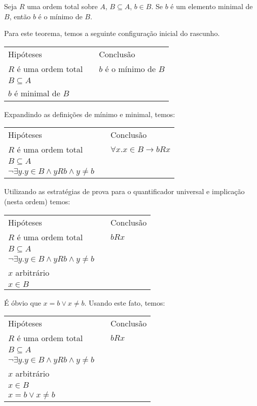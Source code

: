 \begin{Theorem}
Seja $R$ uma ordem total sobre $A$, $B\subseteq A$, $b\in B$. Se $b$ é
um elemento minimal de $B$, então $b$ é o mínimo de $B$.
\end{Theorem}
Para este teorema, temos a seguinte configuração inicial do rascunho.
\begin{flushleft}
\begin{tabular}{lcl}
 Hip\'oteses & \hspace{1cm} & Conclusão\\
$R$ é uma ordem total & & $b$ é o mínimo de $B$\\
$B \subseteq A$ & & \\
$b$ é minimal de $B$ \\
 \end{tabular}
\end{flushleft}
Expandindo as definições de mínimo e minimal, temos:
\begin{flushleft}
\begin{tabular}{lcl}
 Hip\'oteses & \hspace{1cm} & Conclusão\\
$R$ é uma ordem total & & $\forall x. x \in B \to b R x$\\
$B \subseteq A$ & & \\
$\neg \exists y. y\in B \land yRb \land y \neq b$\\
 \end{tabular}
\end{flushleft}
Utilizando as estratégias de prova para o quantificador universal e
implicação (nesta ordem) temos:
\begin{flushleft}
\begin{tabular}{lcl}
 Hip\'oteses & \hspace{1cm} & Conclusão\\
$R$ é uma ordem total & & $b R x$\\
$B \subseteq A$ & & \\
$\neg \exists y. y\in B \land yRb \land y \neq b$\\
$x$ arbitrário & &\\
$x \in B$ & & \\
 \end{tabular}
\end{flushleft}
É óbvio que  $x = b \lor x \neq b$. Usando este fato, temos:
\begin{flushleft}
\begin{tabular}{lcl}
 Hip\'oteses & \hspace{1cm} & Conclusão\\
$R$ é uma ordem total & & $b R x$\\
$B \subseteq A$ & & \\
$\neg \exists y. y\in B \land yRb \land y \neq b$\\
$x$ arbitrário & &\\
$x \in B$ & & \\
$x = b \lor x \neq b$ & & \\
 \end{tabular}
\end{flushleft}
